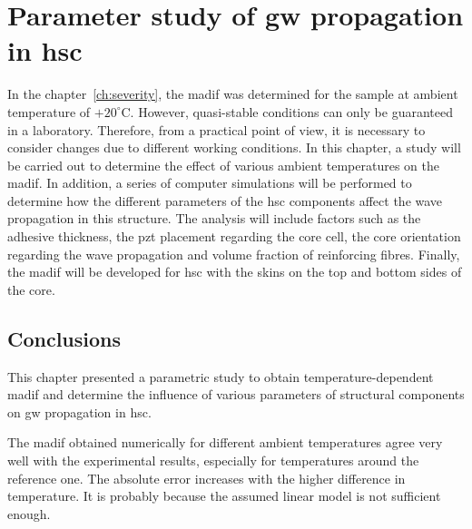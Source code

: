 
\chapter[Parameter study of \ac{gw} propagation in \ac{hsc}]{Parameter study of \ac{gw} propagation in \ac{hsc}}
\label{ch:tempEffects}

In the chapter~\ref{ch:severity}, the \ac{madif} was determined for the sample at ambient temperature of \(+20^{\circ}\)C.
However, quasi-stable conditions can only be guaranteed in a laboratory.
Therefore, from a practical point of view, it is necessary to consider changes due to different working conditions.
In this chapter, a study will be carried out to determine the effect of various ambient temperatures on the \ac{madif}.
In addition, a series of computer simulations will be performed to determine how the different parameters of the \ac{hsc} components affect the wave propagation in this structure.
The analysis will include factors such as the adhesive thickness, the \ac{pzt} placement regarding the core cell, the core orientation regarding the wave propagation and volume fraction of reinforcing fibres.
Finally, the \ac{madif} will be developed for \ac{hsc} with the skins on the top and bottom sides of the core.


\section{Conclusions}
\label{sec:conclusionsTemp}
This chapter presented a parametric study to obtain temperature-dependent \ac{madif} and determine the influence of various parameters of structural components on \ac{gw} propagation in \ac{hsc}.

The \ac{madif} obtained numerically for different ambient temperatures agree very well with the experimental results, especially for temperatures around the reference one.
The absolute error increases with the higher difference in temperature.
It is probably because the assumed linear model is not sufficient enough.

